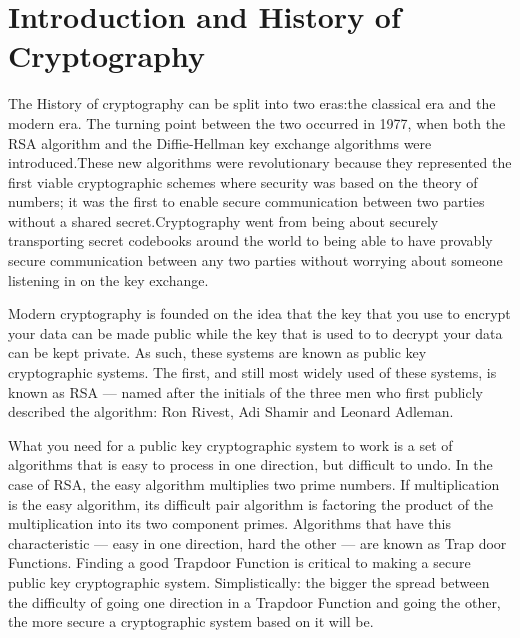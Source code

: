 \documentclass{article}
\begin{document}
\newpage
\section{Introduction and History of Cryptography}
The History of cryptography can be split into two eras:the classical era and the modern era. The turning point between the two occurred in 1977, when both the RSA algorithm and the Diffie-Hellman key exchange algorithms were introduced.These new algorithms were revolutionary because they represented the first viable cryptographic schemes where security was based on the theory of numbers; it was the first to enable secure communication between two parties without a shared secret.Cryptography went from being about securely transporting secret codebooks around the world to being able to have provably secure communication between any two parties without worrying about someone listening in on the key exchange.

Modern cryptography is founded on the idea that the key that you use to encrypt your data can be made public while the key that is used to to decrypt your data can be kept private. As such, these systems are known as public key cryptographic systems. The first, and still most widely used of these systems, is known as RSA — named after the initials of the three men who first publicly described the algorithm: Ron Rivest, Adi Shamir and Leonard Adleman.

What you need for a public key cryptographic system to work is a set of algorithms that is easy to process in one direction, but difficult to undo. In the case of RSA, the easy algorithm multiplies two prime numbers. If multiplication is the easy algorithm, its difficult pair algorithm is factoring the product of the multiplication into its two component primes. Algorithms that have this characteristic — easy in one direction, hard the other — are known as Trap door Functions. Finding a good Trapdoor Function is critical to making a secure public key cryptographic system. Simplistically: the bigger the spread between the difficulty of going one direction in a Trapdoor Function and going the other, the more secure a cryptographic system based on it will be.
\end{document}
